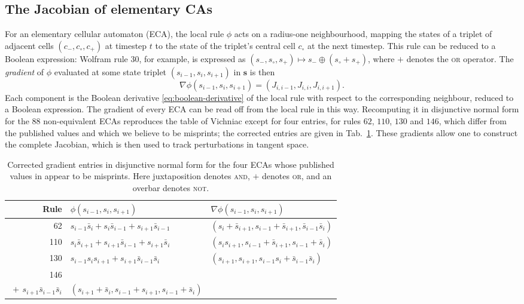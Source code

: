\documentclass[a4paper,fleqn]{cas-dc}
\begin{document}
\subsection{The Jacobian of elementary CAs}

For an elementary cellular automaton (ECA), the local rule $\phi$ acts on a radius-one neighbourhood, mapping the states of a triplet of adjacent cells $(c_-, c_\circ, c_+)$ at timestep $t$ to the state of the triplet's central cell $c_\circ$ at the next timestep. This rule can be reduced to a Boolean expression: Wolfram rule $30$, for example, is expressed as $(s_-, s_\circ, s_+) \mapsto s_- \oplus (s_\circ + s_+)$, where $+$ denotes the \textsc{or} operator. The \emph{gradient} of $\phi$ evaluated at some state triplet $(s_{i-1}, s_i, s_{i+1})$ in $\mathbf{s}$ is then 
\begin{equation}
    \label{eq:eca-gradient}
    \nabla\phi(s_{i-1}, s_i, s_{i+1}) = (J_{i,i-1},J_{i,i},J_{i,i+1}).
\end{equation}
Each component is the Boolean derivative \eqref{eq:boolean-derivative} of the local rule with respect to the corresponding neighbour, reduced to a Boolean expression. The gradient of every ECA can be read off from the local rule in this way. Recomputing it in disjunctive normal form for the $88$ non-equivalent ECAs reproduces the table of Vichniac \cite{vichniac1990boolean} except for four entries, for rules $62$, $110$, $130$ and $146$, which differ from the published values and which we believe to be misprints; the corrected entries are given in Tab.~\ref{tab:gradient-table}. These gradients allow one to construct the complete Jacobian, which is then used to track perturbations in tangent space.

\begin{table}[t]
    \centering
    \caption{Corrected gradient entries in disjunctive normal form for the four ECAs whose published
    values in \cite{vichniac1990boolean} appear to be misprints. Here juxtaposition denotes \textsc{and}, $+$ denotes \textsc{or}, and an overbar denotes \textsc{not}.}
    \label{tab:gradient-table}
    \begin{tabular*}{\tblwidth}{@{}r l l @{}}
    \toprule
    \textbf{Rule} & $\phi(s_{i-1},s_i,s_{i+1})$ & $\nabla\phi(s_{i-1},s_i,s_{i+1})$\\
    \midrule
    62 & $s_{i-1}\bar{s}_i+s_i\bar{s}_{i-1}+s_{i+1}\bar{s}_{i-1}$ & $(s_i+\bar{s}_{i+1},s_{i-1}+\bar{s}_{i+1},\bar{s}_{i-1}\bar{s}_i)$\\
    110 & $s_i\bar{s}_{i+1}+s_{i+1}\bar{s}_{i-1}+s_{i+1}\bar{s}_i$ & $(s_is_{i+1},s_{i-1}+\bar{s}_{i+1},s_{i-1}+\bar{s}_i)$ \\
    130 & $s_{i-1}s_is_{i+1}+s_{i+1}\bar{s}_{i-1}\bar{s}_i$ & $(s_{i+1},s_{i+1},s_{i-1}s_i+\bar{s}_{i-1}\bar{s}_i)$ \\
    146 & \makecell[tl]{$s_{i-1}s_is_{i+1}+s_{i-1}\bar{s}_i\bar{s}_{i+1}$ \\ $\ +\,s_{i+1}\bar{s}_{i-1}\bar{s}_i$} & $(s_{i+1}+\bar{s}_i,s_{i-1}+s_{i+1},s_{i-1}+\bar{s}_i)$\\
    \bottomrule
    \end{tabular*}
\end{table}
\end{document}
